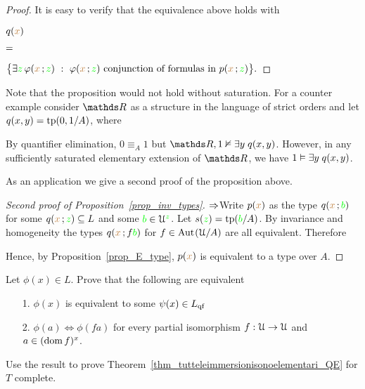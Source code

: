 \begin{proof}
  It is easy to verify that the equivalence above holds with
  \def\medrel#1{\parbox{6ex}{$\displaystyle\hfil #1$}}
  \def\ceq#1#2#3{\parbox[b]{10ex}{$\displaystyle #1$}\medrel{#2}$\displaystyle  #3$}

  \ceq{\hfill q({\mr x})}{=}{\big\{ \E {\gr z}\,\phi({\mr x}\,;{\gr z})\ :\ \phi({\mr x}\,;{\gr z}) \textrm{ conjunction of formulas in } p({\mr x}\,;{\gr z}) \big\}.}
\end{proof}

Note that the proposition would not hold without saturation.
For a counter example consider $\RR$ as a structure in the language of strict orders and let $q(x,y)={\rm tp}(0,1/A)$, where 


By quantifier elimination, $0\equiv_{A}1$ but $\RR,1\notmodels\E y\;q(x,y)$.
However, in any sufficiently saturated elementary extension of $\RR$, we have $1\vDash\exists y\;q(x,y)$.

As an application we give a second proof of the proposition above.

\begin{proof}[Second proof of Proposition~\ref{prop_inv_types}] $\Rightarrow$\quad  Write $p({\color{brown} x})$ as the type $q({\color{brown} x}\,;{\color{green} b})$ for some $q({\color{brown} x}\,;{\color{green} z})\subseteq L$ and some ${\color{green} b}\in\EuScript U^{\color{green} z}$.
Let $s({\color{green} z})={\rm tp}({\color{green} b}/A)$.
By invariance and homogeneity the types $q({\color{brown} x}\,;f{\color{green} b})$ for $f\in{\rm Aut\kern.15ex}(\EuScript U/A)$ are all equivalent.
Therefore

\smallskip

\smallskip

\smallskip

Hence, by Proposition~\ref{prop_E_type}, $p({\color{brown} x})$ is equivalent to a type over $A$.
\end{proof}

\begin{exercise}\label{ex_qe_in_U}
  Let $\phi(x)\in L$. Prove that the following are equivalent
  \begin{itemize}
   \item[1.] $\phi(x)$ is equivalent to some $\psi(x)\in L_{\rm qf}$
   \item[2.] $\phi(a)\iff \phi(fa)$ for every partial isomorphism $f:\EuScript U\to\EuScript U$ and $a\in(\mathop{\rm dom} f)^{x}$.
  \end{itemize}
  Use the result to prove Theorem~\ref{thm_tutteleimmersionisonoelementari_QE} for $T$ complete.
  \end{exercise}

